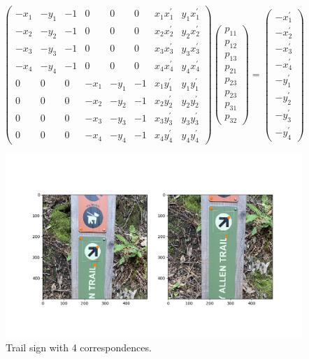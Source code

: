 \documentclass[]{article}
\begin{document}
		\[\left(\begin{array}{cccccccc}
			-x_{1} & -y_{1} & -1 & 0 & 0 & 0 & x_{1} x_{1}^{\prime} & y_{1} x_{1}^{\prime} \\
			-x_{2} & -y_{2} & -1 & 0 & 0 & 0 & x_{2} x_{2}^{\prime} & y_{2} x_{2}^{\prime} \\
			-x_{3} & -y_{3} & -1 & 0 & 0 & 0 & x_{3} x_{3}^{\prime} & y_{3} x_{3}^{\prime} \\
			-x_{4} & -y_{4} & -1 & 0 & 0 & 0 & x_{4} x_{4}^{\prime} & y_{4} x_{4}^{\prime} \\
			0 & 0 & 0 & -x_{1} & -y_{1} & -1 & x_{1} y_{1}^{\prime} & y_{1} y_{1}^{\prime} \\
			0 & 0 & 0 & -x_{2} & -y_{2} & -1 & x_{2} y_{2}^{\prime} & y_{2} y_{2}^{\prime} \\
			0 & 0 & 0 & -x_{3} & -y_{3} & -1 & x_{3} y_{3}^{\prime} & y_{3} y_{3}^{\prime} \\
			0 & 0 & 0 & -x_{4} & -y_{4} & -1 & x_{4} y_{4}^{\prime} & y_{4} y_{4}^{\prime}
		\end{array}\right)\left(\begin{array}{c}
			p_{11} \\
			p_{12} \\
			p_{13} \\
			p_{21} \\
			p_{23} \\
			p_{23} \\
			p_{31} \\
			p_{32}
		\end{array}\right)=\left(\begin{array}{c}
			-x_{1}^{\prime} \\
			-x_{2}^{\prime} \\
			-x_{3}^{\prime} \\
			-x_{4}^{\prime} \\
			-y_{1}^{\prime} \\
			-y_{2}^{\prime} \\
			-y_{3}^{\prime} \\
			-y_{4}^{\prime}
		\end{array}\right)\]
		\begin{figure}[H]
			\centering
			\includegraphics[width=6.5in]{test_images/sign_4_correspondences.png}
			\caption{Trail sign with 4 correspondences.}
		\end{figure}
		
\end{document}
